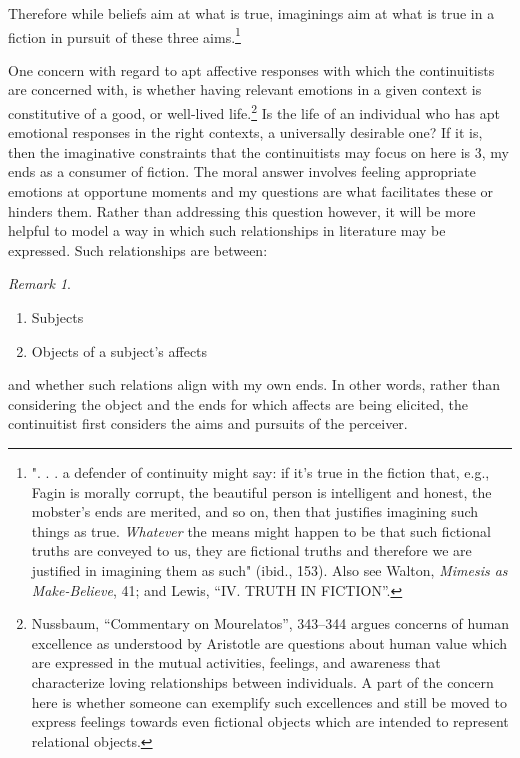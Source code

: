 \documentclass[phdthesis,12pt,final]{wuthesis}
\theoremstyle{definition}
\theoremstyle{definition}
\theoremstyle{definition}
\theoremstyle{definition}
\theoremstyle{remark}
\newtheorem*{remark}{Remark}
\begin{document}
\noindent Therefore while beliefs aim at what is true, imaginings aim at what is true in a fiction in pursuit of these three aims.\footnote{". . . a defender of continuity might say: if it's true in the fiction that, e.g., Fagin is morally corrupt, the beautiful person is intelligent and honest, the mobster's ends are merited, and so on, then that justifies imagining such things as true. \emph{Whatever} the means might happen to be that such fictional truths are conveyed to us, they are fictional truths and therefore we are justified in imagining them as such" (ibid., 153). Also see Walton, \emph{Mimesis as {Make-Believe}}, 41; and Lewis, {``{IV}. {TRUTH IN FICTION}''}.}

One concern with regard to apt affective responses with which the continuitists are concerned with, is whether having relevant emotions in a given context is constitutive of a good, or well-lived life.\footnote{Nussbaum, {``Commentary on {Mourelatos}''}, 343--344 argues concerns of human excellence as understood by Aristotle are questions about human value which are expressed in the mutual activities, feelings, and awareness that characterize loving relationships between individuals. A part of the concern here is whether someone can exemplify such excellences and still be moved to express feelings towards even fictional objects which are intended to represent relational objects.} Is the life of an individual who has apt emotional responses in the right contexts, a universally desirable one? If it is, then the imaginative constraints that the continuitists may focus on here is 3, my ends as a consumer of fiction. The moral answer involves feeling appropriate emotions at opportune moments and my questions are what facilitates these or hinders them. Rather than addressing this question however, it will be more helpful to model a way in which such relationships in literature may be expressed. Such relationships are between:

\begin{remark}
\leavevmode

\begin{enumerate}
\def\labelenumi{\arabic{enumi}.}
\tightlist
\item
  Subjects
\item
  Objects of a subject's affects
\end{enumerate}

\end{remark}

\noindent and whether such relations align with my own ends. In other words, rather than considering the object and the ends for which affects are being elicited, the continuitist first considers the aims and pursuits of the perceiver.
\end{document}
